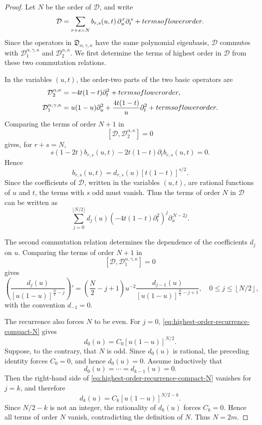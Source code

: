 \documentclass[10pt,a4paper]{amsart}
\begin{document}
\begin{proof}
Let \(N\) be the order of \(\mathcal D\), and write
\[
\mathcal D
=
\sum_{r+s=N}
b_{r,s}(u,t)\,
\partial_u^{\,r}\partial_t^{\,s}
+
\textup{terms of lower order}.
\]
Since the operators in \(\mathfrak D_{\alpha,\gamma,\kappa}\) have the
same polynomial eigenbasis, \(\mathcal D\) commutes with
\(\mathcal D_1^{\alpha,\gamma,\kappa}\) and
\(\mathcal D_2^{\alpha,\kappa}\). We first determine the terms of highest
order in \(\mathcal D\) from these two commutation relations.

In the variables \((u,t)\), the order-two parts of the two basic
operators are
\begin{align*}
\mathcal D_2^{\alpha,\kappa}
&=
-4t(1-t)\partial_t^2
+
\textup{terms of lower order},\\
\mathcal D_1^{\alpha,\gamma,\kappa}
&=
u(1-u)\partial_u^2
+
\frac{4t(1-t)}{u}\partial_t^2
+
\textup{terms of lower order}.
\end{align*}
Comparing the terms of order \(N+1\) in
\[
[\mathcal D,\mathcal D_2^{\alpha,\kappa}]=0
\]
gives, for \(r+s=N\),
\[
s(1-2t)b_{r,s}(u,t)
-
2t(1-t)\partial_t b_{r,s}(u,t)
=
0.
\]
Hence
\[
b_{r,s}(u,t)
=
d_{r,s}(u)[t(1-t)]^{s/2}.
\]
Since the coefficients of \(\mathcal D\), written in the variables
\((u,t)\), are rational functions of \(u\) and \(t\), the terms with
\(s\) odd must vanish. Thus the terms of order \(N\) in \(\mathcal D\)
can be written as
\begin{equation}\label{eq:D-highest-order-N}
\sum_{j=0}^{\lfloor N/2\rfloor}
d_j(u)
\left(-4t(1-t)\partial_t^2\right)^j
\partial_u^{\,N-2j}.
\end{equation}

The second commutation relation determines the dependence of the
coefficients \(d_j\) on \(u\). Comparing the terms of order \(N+1\) in
\[
[\mathcal D,\mathcal D_1^{\alpha,\gamma,\kappa}]=0
\]
gives
\begin{equation}\label{eq:highest-order-recurrence-compact-N}
\left(
\frac{d_j(u)}
{[u(1-u)]^{\frac{N}{2}-j}}
\right)'
=
\left(\frac{N}{2}-j+1\right)u^{-2}
\frac{d_{j-1}(u)}
{[u(1-u)]^{\frac{N}{2}-j+1}},
\quad
0\leq j\leq \left\lfloor N/2\right\rfloor,
\end{equation}
with the convention \(d_{-1}=0\).

The recurrence also forces \(N\) to be even. For \(j=0\),
\eqref{eq:highest-order-recurrence-compact-N} gives
\[
d_0(u)=C_0[u(1-u)]^{N/2}.
\]
Suppose, to the contrary, that \(N\) is odd. Since \(d_0(u)\) is
rational, the preceding identity forces \(C_0=0\), and hence
\(d_0(u)=0\). Assume inductively that
\[
d_0(u)=\cdots=d_{k-1}(u)=0.
\]
Then the right-hand side of
\eqref{eq:highest-order-recurrence-compact-N} vanishes for \(j=k\), and
therefore
\[
d_k(u)=C_k[u(1-u)]^{N/2-k}.
\]
Since \(N/2-k\) is not an integer, the rationality of \(d_k(u)\) forces
\(C_k=0\). Hence all terms of order \(N\) vanish, contradicting the
definition of \(N\). Thus \(N=2m\).


\end{proof}
\end{document}
